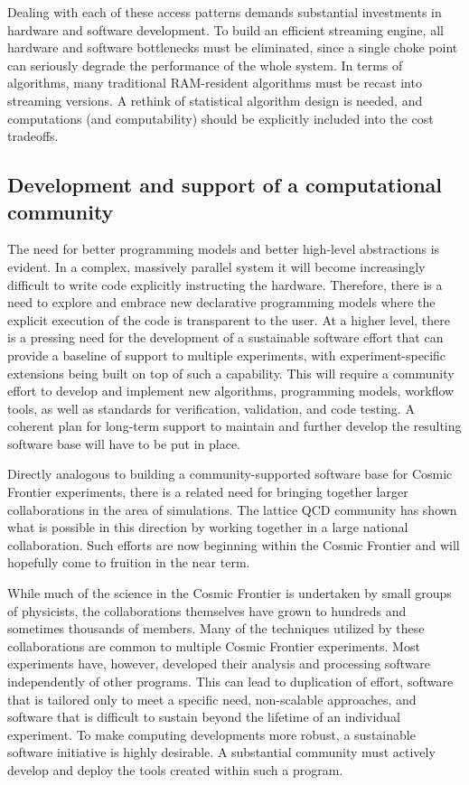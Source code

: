 Dealing with each of these access patterns demands substantial
investments in hardware and software development. To build an
efficient streaming engine, all hardware and software bottlenecks must
be eliminated, since a single choke point can seriously degrade the
performance of the whole system. In terms of algorithms, many
traditional RAM-resident algorithms must be recast into streaming
versions. A rethink of statistical algorithm design is needed, and
computations (and computability) should be explicitly included into
the cost tradeoffs.

\subsection{Development and support of a computational community}
The need for better programming models and better high-level
abstractions is evident. In a complex, massively parallel system it
will become increasingly difficult to write code explicitly
instructing the hardware. Therefore, there is a need to explore and
embrace new declarative programming models where the explicit
execution of the code is transparent to the user. At a higher level,
there is a pressing need for the development of a sustainable software
effort that can provide a baseline of support to multiple experiments,
with experiment-specific extensions being built on top of such a
capability. This will require a community effort to develop and
implement new algorithms, programming models, workflow tools, as well
as standards for verification, validation, and code testing. A
coherent plan for long-term support to maintain and further develop
the resulting software base will have to be put in place.

Directly analogous to building a community-supported software base for
Cosmic Frontier experiments, there is a related need for bringing
together larger collaborations in the area of simulations. The lattice
QCD community has shown what is possible in this direction by working
together in a large national collaboration. Such efforts are now
beginning within the Cosmic Frontier and will hopefully come to
fruition in the near term.

While much of the science in the Cosmic Frontier is undertaken by
small groups of physicists, the collaborations themselves have grown
to hundreds and sometimes thousands of members. Many of the techniques
utilized by these collaborations are common to multiple Cosmic
Frontier experiments. Most experiments have, however, developed their
analysis and processing software independently of other programs. This
can lead to duplication of effort, software that is tailored only to
meet a specific need, non-scalable approaches, and software that is
difficult to sustain beyond the lifetime of an individual
experiment. To make computing developments more robust, a sustainable
software initiative is highly desirable. A substantial community must actively
develop and deploy the tools created within such a program.

